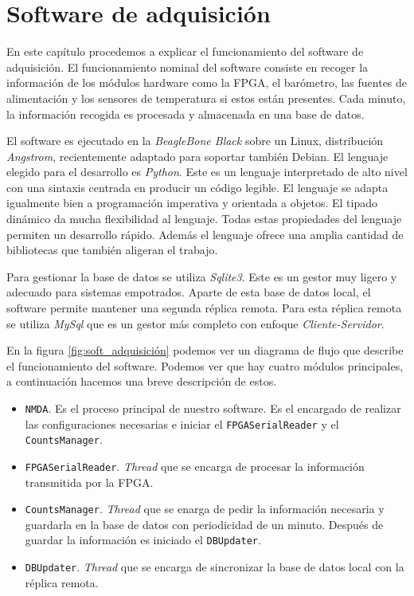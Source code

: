 \chapter{Software de adquisición}
\label{cap3}
    En este capítulo procedemos a explicar el funcionamiento del software de
    adquisición. El funcionamiento nominal del software consiste en recoger la
    información de los módulos hardware como la FPGA, el barómetro, las fuentes
    de alimentación y los sensores de temperatura si estos están presentes.
    Cada minuto, la información recogida es procesada y almacenada en una base
    de datos. 
    \par
    El software es ejecutado en la \emph{BeagleBone Black} sobre un Linux,
    distribución \emph{Angstrom}, recientemente adaptado para soportar también
    Debian. El lenguaje elegido para el desarrollo es
    \emph{Python}\cite{Python}. Este es un lenguaje interpretado de alto nivel
    con una sintaxis centrada en producir un código legible. El lenguaje se
    adapta igualmente bien a programación imperativa y orientada a objetos. El
    tipado dinámico da mucha flexibilidad al lenguaje. Todas estas propiedades
    del lenguaje permiten un desarrollo rápido. Además el lenguaje ofrece una
    amplia cantidad de bibliotecas que también aligeran el trabajo. 
    \par
    Para gestionar la base de datos se utiliza \emph{Sqlite3}\cite{Sqlite}.
    Este es un gestor muy ligero y adecuado para sistemas empotrados. Aparte de
    esta base de datos local, el software permite mantener una segunda réplica
    remota. Para esta réplica remota se utiliza \emph{MySql}\cite{MySql} que es
    un gestor más completo con enfoque \emph{Cliente-Servidor}.
    \par
    En la figura \ref{fig:soft_adquisición} podemos ver un diagrama de flujo
    que describe el funcionamiento del software. Podemos ver que hay cuatro
    módulos principales, a continuación hacemos una breve descripción de estos. 
    \begin{itemize}
        \item	\texttt{NMDA}. Es el proceso principal de nuestro software. Es
            el encargado de realizar las configuraciones necesarias e iniciar
            el \texttt{FPGASerialReader} y el \texttt{CountsManager}.
        \item	\texttt{FPGASerialReader}. \emph{Thread} que se encarga de
            procesar la información transmitida por la FPGA.
        \item	\texttt{CountsManager}. \emph{Thread} que se enarga de pedir la
            información necesaria y guardarla en la base de datos con
            periodicidad de un minuto. Después de guardar la información es
            iniciado el \texttt{DBUpdater}.
        \item	\texttt{DBUpdater}. \emph{Thread} que se encarga de sincronizar la base de datos local con la réplica remota.
    \end{itemize}
